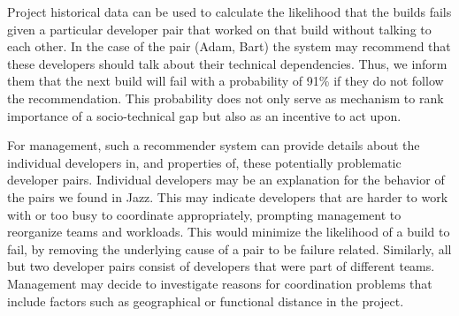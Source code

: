 \documentclass{sig-alternate}
\begin{document}
Project historical data can be used to calculate the likelihood that the builds fails given a particular developer pair that worked on that build without talking to each other.
%
In the case of the pair (Adam, Bart) the system may recommend that these
developers should talk about their technical dependencies. Thus, we inform them that the next build will fail with a probability of 91\% if they do not follow the recommendation.
% 
This probability does not only serve as mechanism to rank importance of a
socio-technical gap but also as an incentive to act upon.


For management, such a recommender system can provide details about the individual developers in, and properties of, these potentially problematic developer pairs. 
Individual developers may be an explanation for the behavior of the pairs we found in Jazz\texttrademark. 
This may indicate developers that are harder to work with or too busy to coordinate appropriately, prompting management to reorganize teams and workloads.
This would minimize the likelihood of a build to fail, by removing the underlying cause of a pair to be failure related. Similarly, all but two developer pairs consist of developers that were part of different teams.
Management may decide to investigate reasons for coordination problems that include factors such as geographical or functional distance in the project. 





\end{document}
